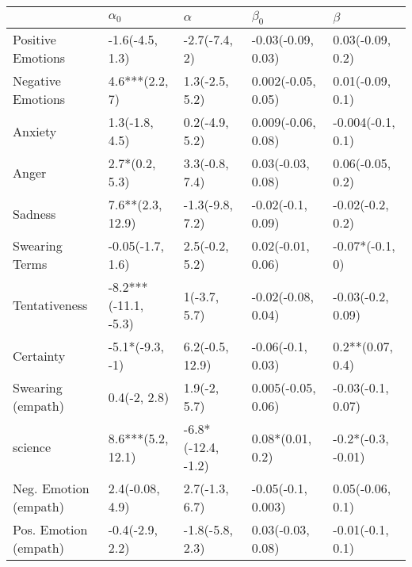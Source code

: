 \begin{tabular}{lllll}
\toprule
{} &            $\alpha_0$ &            $\alpha$ &           $\beta_0$ &             $\beta$ \\
\midrule
Positive Emotions     &       -1.6(-4.5, 1.3) &       -2.7(-7.4, 2) &  -0.03(-0.09, 0.03) &    0.03(-0.09, 0.2) \\
Negative Emotions     &        4.6***(2.2, 7) &      1.3(-2.5, 5.2) &  0.002(-0.05, 0.05) &    0.01(-0.09, 0.1) \\
Anxiety               &        1.3(-1.8, 4.5) &      0.2(-4.9, 5.2) &  0.009(-0.06, 0.08) &   -0.004(-0.1, 0.1) \\
Anger                 &        2.7*(0.2, 5.3) &      3.3(-0.8, 7.4) &   0.03(-0.03, 0.08) &    0.06(-0.05, 0.2) \\
Sadness               &      7.6**(2.3, 12.9) &     -1.3(-9.8, 7.2) &   -0.02(-0.1, 0.09) &    -0.02(-0.2, 0.2) \\
Swearing Terms        &      -0.05(-1.7, 1.6) &      2.5(-0.2, 5.2) &   0.02(-0.01, 0.06) &     -0.07*(-0.1, 0) \\
Tentativeness         &  -8.2***(-11.1, -5.3) &        1(-3.7, 5.7) &  -0.02(-0.08, 0.04) &   -0.03(-0.2, 0.09) \\
Certainty             &       -5.1*(-9.3, -1) &     6.2(-0.5, 12.9) &   -0.06(-0.1, 0.03) &    0.2**(0.07, 0.4) \\
Swearing (empath)     &          0.4(-2, 2.8) &        1.9(-2, 5.7) &  0.005(-0.05, 0.06) &   -0.03(-0.1, 0.07) \\
science               &     8.6***(5.2, 12.1) &  -6.8*(-12.4, -1.2) &    0.08*(0.01, 0.2) &  -0.2*(-0.3, -0.01) \\
Neg. Emotion (empath) &       2.4(-0.08, 4.9) &      2.7(-1.3, 6.7) &  -0.05(-0.1, 0.003) &    0.05(-0.06, 0.1) \\
Pos. Emotion (empath) &       -0.4(-2.9, 2.2) &     -1.8(-5.8, 2.3) &   0.03(-0.03, 0.08) &    -0.01(-0.1, 0.1) \\
\bottomrule
\end{tabular}
